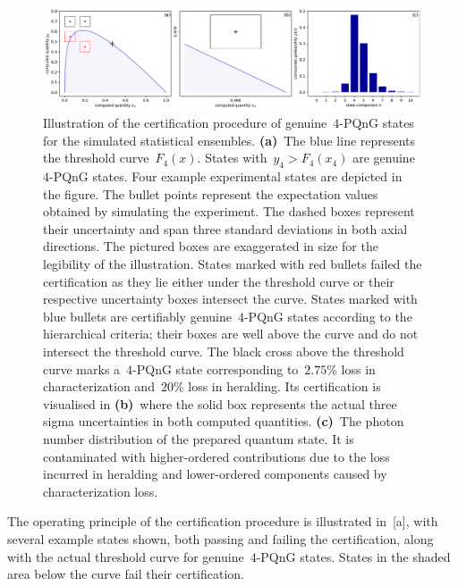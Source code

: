 \documentclass{optica-article}
\begin{document}
\begin{figure}[h]
  \bgroup
    \hspace*{-0.125\columnwidth}%
    \includegraphics[width = 1.25 \columnwidth]{import/illustrate_process.pdf}
  \egroup
  \caption{
    Illustration of the certification procedure of genuine~$4$-PQnG states for the simulated statistical ensembles. \textbf{(a)}~The blue line represents the threshold curve~$F_{4} (x)$. States with~$y_{4} > F_{4}(x_{4})$ are genuine~$4$-PQnG states. Four example experimental states are depicted in the figure. The bullet points represent the expectation values obtained by simulating the experiment. The dashed boxes represent their uncertainty and span three standard deviations in both axial directions. The pictured boxes are exaggerated in size for the legibility of the illustration. States marked with red bullets failed the certification as they lie either under the threshold curve or their respective uncertainty boxes intersect the curve. States marked with blue bullets are certifiably genuine~$4$-PQnG states according to the hierarchical criteria; their boxes are well above the curve and do not intersect the threshold curve. The black cross above the threshold curve marks a~$4$-PQnG state corresponding to~$2.75\%$ loss in characterization and~$20\%$ loss in heralding. Its certification is visualised in \textbf{(b)}~where the solid box represents the actual three sigma uncertainties in both computed quantities. \textbf{(c)}~The photon number distribution of the prepared quantum state. It is contaminated with higher-ordered contributions due to the loss incurred in heralding and lower-ordered components caused by characterization loss.
  }
  \label{f-il}
\end{figure}

The operating principle of the certification procedure is illustrated in~[a], with several example states shown, both passing and failing the certification, along with the actual threshold curve for genuine~$4$-PQnG states. States in the shaded area below the curve fail their certification.
\end{document}
